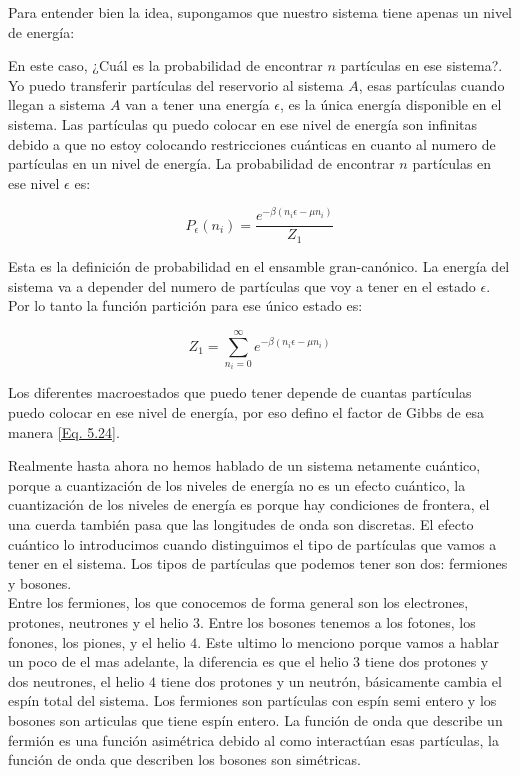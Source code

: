 \documentclass[11pt,fleqn]{book}
\begin{document}
Para entender bien la idea,  supongamos que nuestro sistema tiene apenas un nivel de energía:


En este caso, ¿Cuál es la probabilidad de encontrar $n$ partículas en ese sistema?. Yo puedo transferir partículas del reservorio al sistema $A$, esas partículas cuando llegan a sistema $A$ van a tener una energía $\epsilon$, es la única energía disponible en el sistema. Las partículas qu puedo colocar en ese nivel de energía son infinitas debido a que no estoy colocando restricciones cuánticas en cuanto al numero de partículas en un nivel de energía. La probabilidad de encontrar $n$ partículas en ese nivel $\epsilon$ es:

\begin{equation}
    P_{\epsilon}(n_{i})=\frac{e^{-\beta(n_{i}\epsilon-\mu n_{i})}}{Z_{1}}
    \label{Eq. 5.23}
\end{equation}

Esta es la definición de probabilidad en el ensamble gran-canónico. La energía del sistema va a depender del numero de partículas que voy a tener en el estado $\epsilon$. Por lo tanto la función partición para ese único estado es:

\begin{equation}
    Z_{1}=\sum_{n_{i}=0}^{\infty}e^{-\beta(n_{i}\epsilon-\mu n_{i})}
    \label{Eq. 5.24}
\end{equation}  

Los diferentes macroestados que puedo tener depende de cuantas partículas puedo colocar en ese nivel de energía, por eso defino el factor de Gibbs de esa manera \ref{Eq. 5.24}. 



Realmente hasta ahora no hemos hablado de un sistema netamente cuántico, porque a cuantización de los niveles de energía no es un efecto cuántico, la cuantización de los niveles de energía es porque hay condiciones de frontera, el una cuerda también pasa que las longitudes de onda son discretas. El efecto cuántico lo introducimos cuando distinguimos el tipo de partículas que vamos a tener en el sistema. Los tipos de partículas que podemos tener son dos: fermiones y bosones.\\

Entre los fermiones, los que conocemos de forma general son los electrones, protones, neutrones y el helio $3$. Entre los bosones tenemos a los fotones, los fonones, los piones, y el helio $4$. Este ultimo lo menciono porque vamos a hablar un poco de el mas adelante, la diferencia es que el helio $3$ tiene dos protones y dos neutrones, el helio $4$ tiene dos protones y un neutrón, básicamente cambia el espín total del sistema. Los fermiones son partículas con espín semi entero y los bosones son articulas que tiene  espín entero. La función de onda que describe un fermión es una función asimétrica debido al como interactúan esas partículas, la función de onda que describen los bosones son simétricas.\\
\end{document}
